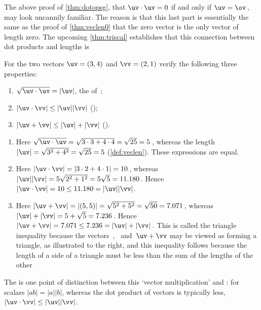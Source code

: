 The above proof of \cref{thm:dotopsg}, that \(\uv\cdot\uv=0\) if and only if \(\uv=\ov\)\,, may look uncannily familiar.
The reason is that this last part is essentially the same as the proof of \cref{thm:veclen0} that the zero vector is the only vector of length zero.
The upcoming \cref{thm:triscal} establishes that this connection between dot products and lengths is 




\begin{example} \label{eg:triscal}
For the two vectors \(\uv=(3,4)\) and \(\vv=(2,1)\) verify the following three properties: 
\begin{enumerate}
\item \(\sqrt{\uv\cdot\uv}=|\uv|\), the  of~\uv;
\item \(|\uv\cdot\vv|\leq|\uv||\vv|\) ();
\item \(|\uv+\vv|\leq|\uv|+|\vv|\) ().
\end{enumerate}

\begin{solution} 
\begin{enumerate}
\item Here \(\sqrt{\uv\cdot\uv}=\sqrt{3\cdot3+4\cdot4}=\sqrt{25}=5\)\,, whereas the length \(|\uv|=\sqrt{3^2+4^2}=\sqrt{25}=5\) (\cref{def:veclen}). These expressions are equal.

\item Here \(|\uv\cdot\vv|=|3\cdot2+4\cdot1|=10\)\,, whereas  \(|\uv||\vv|=5\sqrt{2^2+1^2}=5\sqrt5=11.180\)\,.  
Hence \(|\uv\cdot\vv|=10\leq11.180=|\uv||\vv|\).

\item 
\begin{figbox}{}
Here \(|\uv+\vv|=|(5,5)|=\sqrt{5^2+5^2}=\sqrt{50}=7.071\)\,, whereas \(|\uv|+|\vv|=5+\sqrt5=7.236\)\,.
Hence \(|\uv+\vv|=7.071\leq7.236=|\uv|+|\vv|\)\,.
This is called the triangle inequality because the vectors~\uv, \vv\ and~\(\uv+\vv\) may be viewed as forming a triangle, as illustrated to the right, and this inequality follows because the length of a side  of a triangle must be less than the sum of the lengths of the other 
\end{figbox}
\end{enumerate}
\end{solution}
\end{example}


The  is one point of distinction between this `vector multiplication' and : for scalars \(|ab|=|a||b|\), whereas the dot product of vectors is typically less, \(|\uv\cdot\vv|\leq|\uv||\vv|\).

